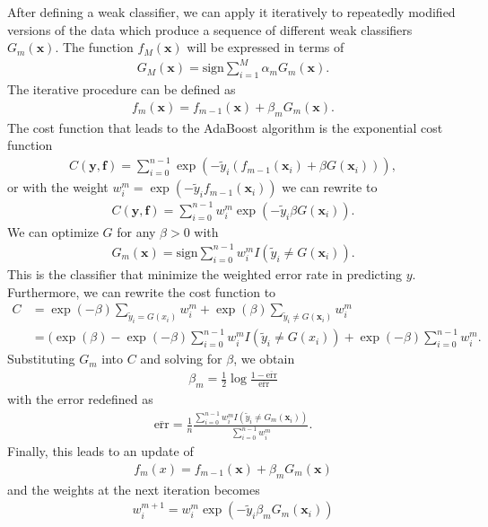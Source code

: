 After defining a weak classifier, we can apply it iteratively to repeatedly modified versions of the data which produce a sequence of different weak classifiers $G_m(\textbf{x})$. The function $f_M(\textbf{x})$ will be expressed in terms of
\begin{align}
  G_M(\textbf{x})=\text{sign}\sum_{i=1}^M \alpha_mG_m(\textbf{x}).
\end{align}
The iterative procedure can be defined as
\begin{align}
  f_m(\textbf{x}) = f_{m-1}(\textbf{x}) + \beta_mG_m(\textbf{x}).
\end{align}
The cost function that leads to the AdaBoost algorithm is the exponential cost function
\begin{align}
  C(\textbf{y},\textbf{f}) = \sum_{i=0}^{n-1} \exp (-\tilde{y}_i(f_{m-1}(\textbf{x}_i) + \beta G(\textbf{x}_i))),
\end{align}
or with the weight $w_i^m = \exp(-\tilde{y}_if_{m-1}(\textbf{x}_i))$ we can rewrite to
\begin{align}
  C(\textbf{y},\textbf{f}) = \sum_{i=0}^{n-1} w_i^m \exp(-\tilde{y}_i\beta G(\textbf{x}_i)).
\end{align}
We can optimize $G$ for any $\beta>0$ with
\begin{align}
  G_m(\textbf{x}) = \text{sign} \sum_{i=0}^{n-1} w_i^m I(\tilde{y}_i \neq G(\textbf{x}_i)).
\end{align}
This is the classifier that minimize the weighted error rate in predicting $y$. Furthermore, we can rewrite the cost function to
\begin{align}
    C &= \exp(-\beta) \sum_{\tilde{y}_i=G(x_i)} w_i^m + \exp (\beta) \sum_{\tilde{y}_i \neq G(\textbf{x}_i)} w_i^m \\
    &= (\exp(\beta)-\exp(-\beta)\sum_{i=0}^{n-1} w_i^m I(\tilde{y}_i \neq G(x_i)) + \exp(-\beta)\sum_{i=0}^{n-1}w_i^m .
\end{align}
Substituting $G_m$ into $C$ and solving for $\beta$, we obtain
\begin{align}
  \beta_m = \frac{1}{2} \log \frac{1 - \overline{\text{err}}}{\overline{\text{err}}}
\end{align}
with the error redefined as
\begin{align}
  \overline{\text{err}} = \frac{1}{n} \frac{ \sum_{i=0}^{n-1} w_i^m I(\tilde{y}_i \neq G_m(\textbf{x}_i)) }{\sum_{i=0}^{n-1} w_i^m}.
\end{align}
Finally, this leads to an update of
\begin{align}
  f_m(x) = f_{m-1}(\textbf{x}) + \beta_m G_m (\textbf{x})
\end{align}
and the weights at the next iteration becomes
\begin{align}
  w_i^{m+1} = w_i^m \exp (-\tilde{y}_i \beta_m G_m(\textbf{x}_i))
\end{align}

